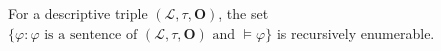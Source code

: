 For a descriptive triple $(\mathcal{L}, \tau, \mathbf{O})$, the set $\{ \varphi : \varphi \text{ is a sentence of } (\mathcal{L}, \tau, \mathbf{O}) \text{ and } \models \varphi \}$ is recursively enumerable.
